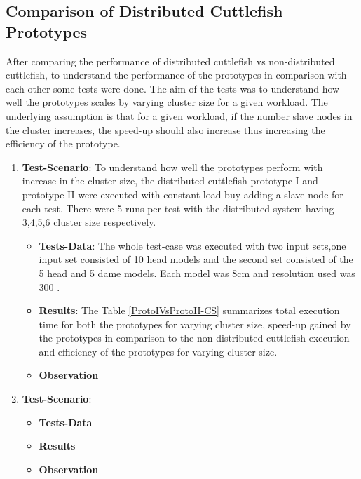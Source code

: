 \subsection{Comparison of Distributed Cuttlefish Prototypes} \label{ProtoComp}

After comparing the performance of distributed cuttlefish vs non-distributed cuttlefish, to understand the performance of the prototypes in comparison with each other some tests were done. The aim of the tests was to understand how well the prototypes scales by varying cluster size for a given workload. The underlying assumption is that for a given workload, if the number slave nodes in the cluster increases, the speed-up should also increase thus increasing the efficiency of the prototype. 

\begin{enumerate}
\item \textbf{Test-Scenario}: To understand how well the prototypes perform with increase in the cluster size, the distributed cuttlefish prototype I and prototype II were executed with constant load buy adding a slave node for each test. There were 5 runs per test with the distributed system having 3,4,5,6 cluster size respectively.
\begin{itemize}
\item \textbf{Tests-Data}: The whole test-case was executed with two input sets,one input set consisted of 10 head models and the second set consisted of the 5 head and 5 dame models. Each model was 8cm and resolution used was 300  .  
\item \textbf{Results}: The Table \ref{ProtoIVsProtoII-CS} summarizes total execution time for both the prototypes for varying cluster size, speed-up gained by the prototypes in comparison to the non-distributed cuttlefish execution and efficiency of the prototypes for varying cluster size. 
\item \textbf{Observation}
\end{itemize}
\item \textbf{Test-Scenario}:
\begin{itemize}
\item \textbf{Tests-Data}
\item \textbf{Results}
\item \textbf{Observation}
\end{itemize}
\end{enumerate}


